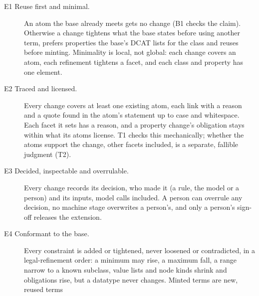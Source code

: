 \begin{description}
\item[E1 Reuse first and minimal.] An atom the base already meets gets no change (B1 checks the claim). Otherwise %
  a change tightens what the base states before using another term, prefers properties the base's \acs{DCAT} %
  lists for the class and reuses before minting. Minimality is local, not global: each change covers %
  an atom, each refinement tightens a facet, and each class and property has one element.
\item[E2 Traced and licensed.] Every change covers at least one existing atom, each link with a reason and a quote %
  found in the atom's statement up to case and whitespace. Each facet it sets has a reason, and a property %
  change's obligation stays within what its atoms license. T1 checks this mechanically; whether the atoms %
  support the change, other facets included, is a separate, fallible judgment (T2). %
\item[E3 Decided, inspectable and overrulable.] Every change records its decision, who made it (a rule, the model %
  or a person) and its inputs, model calls included. A person can overrule any decision, no machine stage %
  overwrites a person's, and only a person's sign-off releases the extension. %
\item[E4 Conformant to the base.] Every constraint is added or tightened, never loosened or contradicted, in a %
  legal-refinement order: a minimum may rise, a maximum fall, a range narrow to a known subclass, value lists and
  node kinds shrink and obligations rise, but a datatype never changes. Minted terms are new, reused terms %

\end{description}

